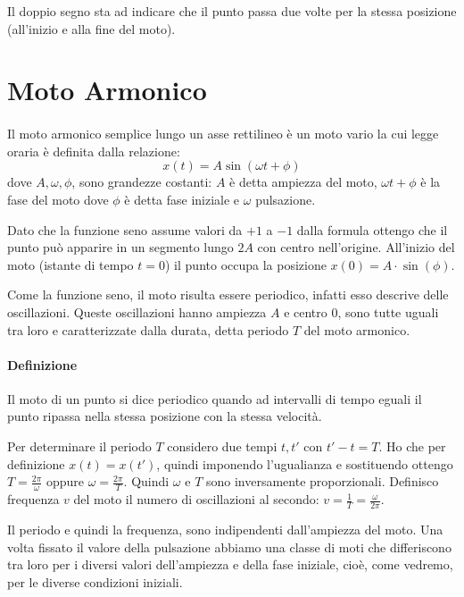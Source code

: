 \documentclass[class=book, crop=false, oneside, 12pt]{standalone}
\begin{document}
Il doppio segno sta ad indicare che il punto passa due volte per la
stessa posizione (all'inizio e alla fine del moto).

\section{Moto Armonico}
\paragraph{}
Il moto armonico semplice lungo un asse rettilineo è un moto vario la cui legge oraria è definita dalla relazione:
\begin{equation}
  x(t) = A \sin (\omega t + \phi)
\end{equation}
dove \(A,\omega, \phi \), sono grandezze costanti: \(A\) è detta ampiezza del moto, \(\omega t + \phi \) è la fase del moto dove
\(\phi \) è detta fase iniziale e \(\omega \) pulsazione.

Dato che la funzione seno assume valori da \(+1\) a \(-1\) dalla formula ottengo che il punto può apparire in un segmento lungo \(2A\) con centro nell'origine.
All'inizio del moto (istante di tempo \(t = 0\)) il punto occupa la posizione \(x(0) = A \cdot \sin (\phi) \).

Come la funzione seno, il moto risulta essere periodico, infatti esso descrive delle oscillazioni.
Queste oscillazioni hanno ampiezza \(A\) e centro \(0\), sono tutte uguali tra loro e caratterizzate dalla durata, detta periodo \(T\) del moto armonico.
\paragraph{Definizione}
Il moto di un punto si dice periodico quando ad intervalli di tempo eguali il punto ripassa nella stessa posizione con la stessa velocità.

Per determinare il periodo \(T\) considero due tempi \(t,t'\) con \(t'-t = T\).
Ho che per definizione \(x(t) = x(t')\), quindi imponendo l'ugualianza e sostituendo ottengo \(T = \frac {2 \pi} {\omega}\) oppure \(\omega = \frac{2 \pi}{T}\).
Quindi \(\omega\) e \(T\) sono inversamente proporzionali.
Definisco frequenza \(v\) del moto il numero di oscillazioni al secondo:
\(v = \frac{1}{T} = \frac{\omega}{2 \pi}\).

Il periodo e quindi la frequenza, sono indipendenti dall'ampiezza del moto.
Una volta fissato il valore della pulsazione abbiamo una classe di moti
che differiscono tra loro per i diversi valori dell'ampiezza e della fase iniziale, cioè, come vedremo, per le diverse condizioni iniziali.
\end{document}
